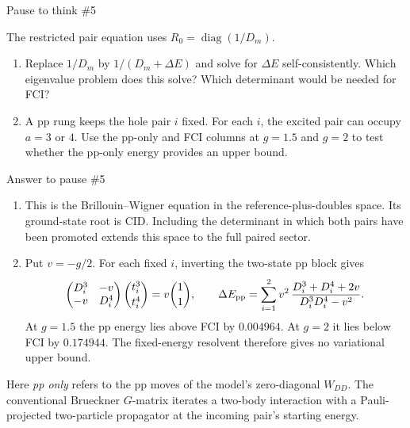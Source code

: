 \documentclass[aspectratio=169,10pt]{beamer}
\newcounter{thinkctr}
\newcommand{\thinkq}[2]{%
  \stepcounter{thinkctr}%
  \vfill
  \begin{tcolorbox}[enhanced,colback=palewarm,colframe=warm,boxrule=1.2pt,arc=4pt,
    grow to left by=6mm,grow to right by=6mm,
    left=16pt,right=16pt,top=16pt,bottom=18pt,
    fonttitle=\bfseries\Large,fontupper=\Large,
    title={Pause to think \#\thethinkctr\hfill\mdseries\normalsize(about #1 min -- discuss with your neighbour)}]
  #2
  \end{tcolorbox}
  \vfill}
\newcommand{\thinka}[1]{%
  \vfill
  \begin{tcolorbox}[enhanced,colback=paleteal,colframe=teal,boxrule=1.2pt,arc=4pt,
    grow to left by=6mm,grow to right by=6mm,
    left=16pt,right=16pt,top=16pt,bottom=18pt,
    fonttitle=\bfseries\Large,fontupper=\large,
    title={Answer to pause \#\thethinkctr}]
  #1
  \end{tcolorbox}
  \vfill}
\begin{document}
\begin{frame}{Pause to think \#5}
\thinkq{3}{The restricted pair equation uses $R_0=\operatorname{diag}(1/D_m)$.
\begin{enumerate}
\item Replace $1/D_m$ by $1/(D_m+\Delta E)$ and solve for $\Delta E$ self-consistently. Which eigenvalue problem does this solve? Which determinant would be needed for FCI?
\item A pp rung keeps the hole pair $i$ fixed. For each $i$, the excited pair can occupy $a=3$ or $4$. Use the pp-only and FCI columns at $g=1.5$ and $g=2$ to test whether the pp-only energy provides an upper bound.
\end{enumerate}}
\end{frame}

\begin{frame}[shrink=5]{Answer to pause \#5}
\thinka{%
\begin{enumerate}
\item This is the Brillouin--Wigner equation in the reference-plus-doubles space. Its ground-state root is CID. Including the determinant in which both pairs have been promoted extends this space to the full paired sector.
\item Put $v=-g/2$. For each fixed $i$, inverting the two-state pp block gives
\[
 \begin{pmatrix}D_i^3&-v\\-v&D_i^4\end{pmatrix}
 \binom{t_i^3}{t_i^4}=v\binom11,\qquad
 \Delta E_{\rm pp}
 =\sum_{i=1}^2 v^2\,\frac{D_i^3+D_i^4+2v}{D_i^3D_i^4-v^2}.
\]
At $g=1.5$ the pp energy lies above FCI by $0.004964$. At $g=2$ it lies below FCI by $0.174944$. The fixed-energy resolvent therefore gives no variational upper bound.
\end{enumerate}}
\small Here \emph{pp only} refers to the pp moves of the model's zero-diagonal $W_{DD}$. The conventional Brueckner $G$-matrix iterates a two-body interaction with a Pauli-projected two-particle propagator at the incoming pair's starting energy.
\end{frame}
\end{document}
